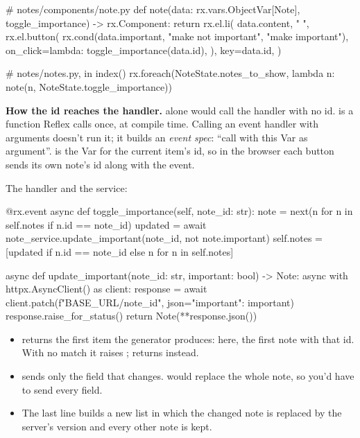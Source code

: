 \begin{py}
# notes/components/note.py
def note(data: rx.vars.ObjectVar[Note], toggle_importance) -> rx.Component:
	return rx.el.li(
		data.content,
		" ",
		rx.el.button(
			rx.cond(data.important, "make not important", "make important"),
			on_click=lambda: toggle_importance(data.id),
		),
		key=data.id,
	)
\end{py}

\begin{py}
# notes/notes.py, in index()
rx.foreach(NoteState.notes_to_show, lambda n: note(n, NoteState.toggle_importance))
\end{py}

\textbf{How the id reaches the handler.}  alone would call the handler with no id.  is a function Reflex calls once, at compile time. Calling an event handler with arguments doesn't run it; it builds an \emph{event spec}: ``call  with this Var as argument''.  is the Var for the current item's id, so in the browser each button sends its own note's id along with the event.

The handler and the service:

\begin{py}
@rx.event
async def toggle_importance(self, note_id: str):
	note = next(n for n in self.notes if n.id == note_id)
	updated = await note_service.update_important(note_id, not note.important)
	self.notes = [updated if n.id == note_id else n for n in self.notes]
\end{py}

\begin{py}
async def update_important(note_id: str, important: bool) -> Note:
	async with httpx.AsyncClient() as client:
		response = await client.patch(f"{BASE_URL}/{note_id}", json={"important": important})
	response.raise_for_status()
	return Note(**response.json())
\end{py}

\begin{itemize}
\item {} returns the first item the generator produces: here, the first note with that id. With no match it raises ;  returns  instead.
\item {} sends only the field that changes.  would replace the whole note, so you'd have to send every field.
\item The last line builds a new list in which the changed note is replaced by the server's version and every other note is kept.
\end{itemize}

